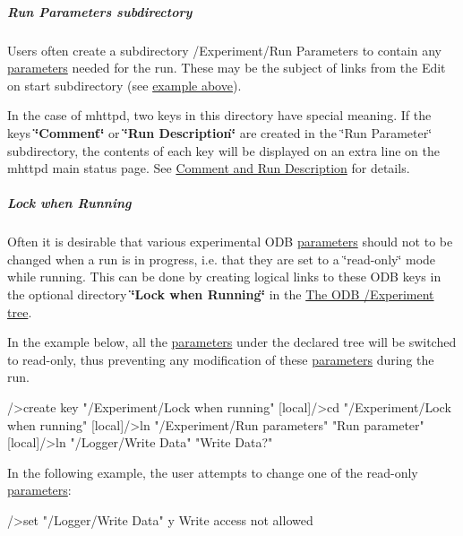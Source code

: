 \par
\hypertarget{RC_customize_ODB_RC_Run_Parameters}{}\subparagraph{Run Parameters subdirectory}\label{RC_customize_ODB_RC_Run_Parameters}
Users often create a subdirectory /Experiment/Run Parameters to contain any \hyperlink{structparameters}{parameters} needed for the run. These may be the subject of links from the Edit on start subdirectory (see \hyperlink{RC_customize_ODB_RC_rp}{example above}). \par
 In the case of mhttpd, two keys in this directory have special meaning. If the keys {\bfseries \char`\"{}Comment\char`\"{}} or {\bfseries \char`\"{}Run Description\char`\"{}} are created in the \char`\"{}Run Parameter\char`\"{} subdirectory, the contents of each key will be displayed on an extra line on the mhttpd main status page. See \hyperlink{RC_mhttpd_status_page_features_RC_Edit_RP}{Comment and Run Description} for details. \par


\par


\label{RC_customize_ODB_idx_ODB_tree_Experiment_Lock-when-Running}
\hypertarget{RC_customize_ODB_idx_ODB_tree_Experiment_Lock-when-Running}{}
 \hypertarget{RC_customize_ODB_RC_Lock_when_Running}{}\subparagraph{Lock when Running}\label{RC_customize_ODB_RC_Lock_when_Running}
Often it is desirable that various experimental ODB \hyperlink{structparameters}{parameters} should not to be changed when a run is in progress, i.e. that they are set to a \char`\"{}read-\/only\char`\"{} mode while running. This can be done by creating logical links to these ODB keys in the optional directory {\bfseries  \char`\"{}Lock when Running\char`\"{} } in the \hyperlink{RC_customize_ODB_RC_ODB_Experiment_Tree}{The ODB /Experiment tree}. \par
 In the example below, all the \hyperlink{structparameters}{parameters} under the declared tree will be switched to read-\/only, thus preventing any modification of these \hyperlink{structparameters}{parameters} during the run. 
\begin{DoxyCode}
  [local]/>create key "/Experiment/Lock when running"
  [local]/>cd "/Experiment/Lock when running"
  [local]/>ln "/Experiment/Run parameters" "Run parameter"
  [local]/>ln "/Logger/Write Data" "Write Data?"
\end{DoxyCode}


In the following example, the user attempts to change one of the read-\/only \hyperlink{structparameters}{parameters}: 
\begin{DoxyCode}
/>set "/Logger/Write Data" y
Write access not allowed
\end{DoxyCode}


